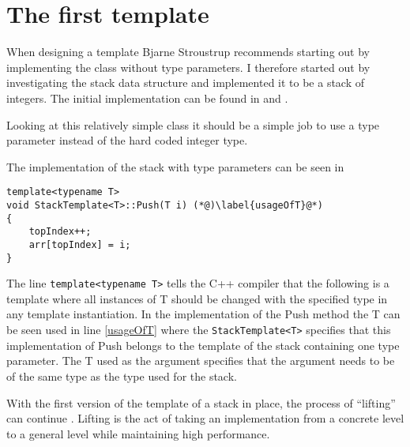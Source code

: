 \section{The first template}
When designing a template Bjarne Stroustrup recommends starting out by implementing the class without type parameters\cite[p.~670]{stroustrup2013c++}. 
I therefore started out by investigating the stack data structure and implemented it to be a stack of integers.
The initial implementation can be found in  and .

Looking at this relatively simple class it should be a simple job to use a type parameter instead of the hard coded integer type.

The implementation of the stack with type parameters can be seen in 

\begin{lstlisting}
template<typename T>
void StackTemplate<T>::Push(T i) (*@)\label{usageOfT}@*)
{
	topIndex++;
	arr[topIndex] = i;
}
\end{lstlisting}

The line \lstinline|template<typename T>| tells the C++ compiler that the following is a template where all instances of T should be changed with the specified type in any template instantiation.
In the implementation of the Push method the T can be seen used in line \ref{usageOfT} where the \lstinline|StackTemplate<T>| specifies that this implementation of Push belongs to the template of the stack containing one type parameter.
The T used as the argument specifies that the argument needs to be of the same type as the type used for the stack. 

With the first version of the template of a stack in place, the process of ``lifting'' can continue . 
Lifting is the act of taking an implementation from a concrete level to a general level while maintaining high performance\cite[p.~700]{stroustrup2013c++}.




